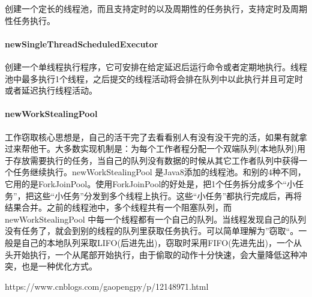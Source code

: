 \documentclass[../../../interview-questions.tex]{subfiles}
\begin{document}
创建一个定长的线程池，而且支持定时的以及周期性的任务执行，支持定时及周期性任务执行。

\paragraph{newSingleThreadScheduledExecutor}

创建一个单线程执行程序，它可安排在给定延迟后运行命令或者定期地执行。线程池中最多执行1个线程，之后提交的线程活动将会排在队列中以此执行并且可定时或者延迟执行线程活动。

\paragraph{newWorkStealingPool}工作窃取核心思想是，自己的活干完了去看看别人有没有没干完的活，如果有就拿过来帮他干。大多数实现机制是：为每个工作者程分配一个双端队列(本地队列)用于存放需要执行的任务，当自己的队列没有数据的时候从其它工作者队列中获得一个任务继续执行。newWorkStealingPool 是Java8添加的线程池。和别的4种不同，它用的是ForkJoinPool。使用ForkJoinPool的好处是，把1个任务拆分成多个“小任务”，把这些“小任务”分发到多个线程上执行。这些“小任务”都执行完成后，再将结果合并。之前的线程池中，多个线程共有一个阻塞队列，而newWorkStealingPool 中每一个线程都有一个自己的队列。当线程发现自己的队列没有任务了，就会到别的线程的队列里获取任务执行。可以简单理解为”窃取“。一般是自己的本地队列采取LIFO(后进先出)，窃取时采用FIFO(先进先出)，一个从头开始执行，一个从尾部开始执行，由于偷取的动作十分快速，会大量降低这种冲突，也是一种优化方式。

https://www.cnblogs.com/gaopengpy/p/12148971.html
\end{document}
